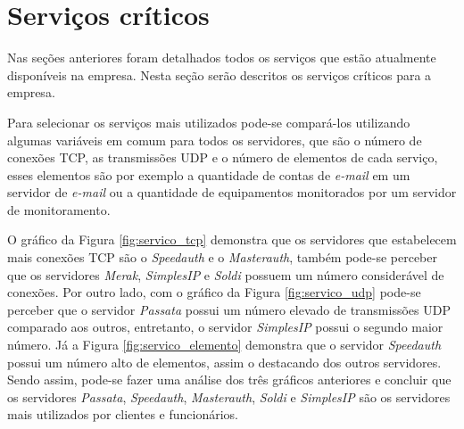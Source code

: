 \section{Serviços críticos}
\label{section:servcrit}

Nas seções anteriores foram detalhados todos os serviços que estão atualmente disponíveis na empresa. Nesta seção serão descritos os serviços 
críticos para a empresa. 

Para selecionar os serviços mais utilizados pode-se compará-los utilizando algumas variáveis em comum para todos os servidores, que são o número 
de conexões \ac{TCP}, as transmissões \ac{UDP} e o número de elementos de cada serviço, esses elementos são por exemplo a quantidade de 
contas de \textit{e-mail} em um servidor de \textit{e-mail} ou a quantidade de equipamentos monitorados por um servidor de monitoramento. 
% 

O gráfico da Figura \ref{fig:servico_tcp} demonstra que os servidores que estabelecem mais conexões \ac{TCP} são o \textit{Speedauth} e o 
\textit{Masterauth}, também pode-se perceber que os servidores \textit{Merak}, \textit{SimplesIP} e \textit{Soldi} possuem um número considerável 
de conexões. Por outro lado, com o gráfico da Figura \ref{fig:servico_udp} pode-se perceber que o servidor \textit{Passata} possui um
número elevado de transmissões \ac{UDP} comparado aos outros, entretanto, o servidor \textit{SimplesIP} possui o segundo maior número. Já a Figura 
\ref{fig:servico_elemento} demonstra que o servidor \textit{Speedauth} possui um número alto de elementos, assim o destacando dos outros servidores.
Sendo assim, pode-se fazer uma análise dos três gráficos anteriores e concluir que os servidores \textit{Passata}, \textit{Speedauth}, 
\textit{Masterauth}, \textit{Soldi} e \textit{SimplesIP} são os servidores mais utilizados por clientes e funcionários.

